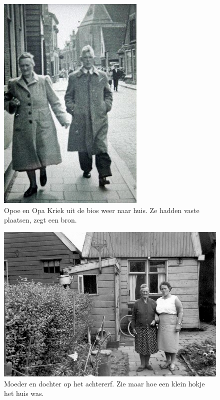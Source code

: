 \documentclass[12pt,twoside, openright]{memoir}
\begin{document}
\begin{figure}
\includegraphics[width=\textwidth]{img/ch3/vandebios}
\caption*{\footnotesize Opoe en Opa Kriek uit de bios weer naar huis. Ze hadden vaste plaatsen, zegt een bron.}
\end{figure}

\begin{figure}
\includegraphics[width=\textwidth]{img/ch3/opoe82jr}
\caption*{\footnotesize Moeder en dochter op het achtererf. Zie maar hoe een klein hokje het huis was.}
\end{figure}
\end{document}
